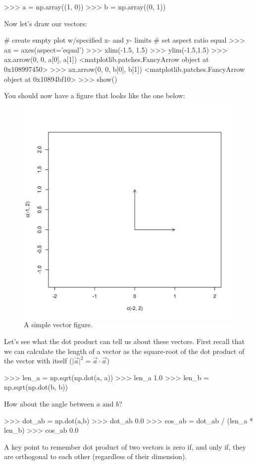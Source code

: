 \begin{python}
>>> a = np.array((1, 0))
>>> b = np.array((0, 1))
\end{python}
%
Now let's draw our vectors:
%
\begin{python}
# create empty plot w/specified x- and y- limits
# set aspect ratio equal 
>>> ax = axes(aspect='equal')
>>> xlim(-1.5, 1.5)
>>> ylim(-1.5,1.5)
>>> ax.arrow(0, 0, a[0], a[1])
<matplotlib.patches.FancyArrow object at 0x108997450>
>>> ax.arrow(0, 0, b[0], b[1])
<matplotlib.patches.FancyArrow object at 0x10894bf10>
>>> show()
\end{python}
%
You should now have a figure that looks like the one below:
\begin{figure}[htbp]
\centering
\includegraphics[width=0.33\columnwidth]{./figures/hands-on2/rightangle.pdf}
\caption{A simple vector figure.}
\end{figure}
%
Let's see what the dot product can tell us about these vectors. First recall that we can calculate the length of a vector as the square-root of the dot product of the vector with itself ($\vert\vec{a}\vert^2  =  \vec{a} \cdot \vec{a}$)
%
\begin{python}
>>> len_a = np.sqrt(np.dot(a, a))
>>> len_a
1.0
>>> len_b = np.sqrt(np.dot(b, b))
\end{python}
%
How about the angle between $a$ and $b$?
\begin{python}
>>> dot_ab = np.dot(a,b)
>>> dot_ab
0.0
>>> cos_ab = dot_ab / (len_a * len_b)
>>> cos_ab
0.0
\end{python}
A key point to remember dot product of two vectors is zero if, and only if, they are orthogonal to each other (regardless of their dimension).


